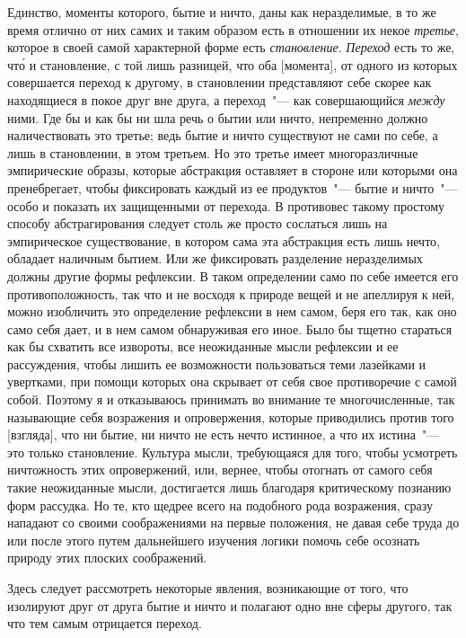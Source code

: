 Единство, моменты которого, бытие и ничто, даны как
неразделимые, в то же время отлично от них самих и таким
образом есть в отношении их некое \emph{третье}, которое
в своей самой характерной форме есть \emph{становление}. \emph{Переход}
есть то же, чт\'о и становление, с той лишь разницей,
что оба [момента], от одного из которых совершается переход
к другому, в становлении представляют себе скорее
как находящиеся в покое друг вне друга, а переход~"--- как
совершающийся \emph{между} ними. Где бы и как бы ни шла
речь о бытии или ничто, непременно должно наличествовать
это третье; ведь бытие и ничто существуют не сами
по себе, а лишь в становлении, в этом третьем. Но это
третье имеет многоразличные эмпирические образы, которые
абстракция оставляет в стороне или которыми она
пренебрегает, чтобы фиксировать каждый из ее продуктов~"---
бытие и ничто~"--- особо и показать их защищенными
от перехода. В противовес такому простому способу
абстрагирования следует столь же просто сослаться лишь
на эмпирическое существование, в котором сама эта абстракция
есть лишь нечто, обладает наличным бытием.
Или же фиксировать разделение неразделимых должны
другие формы рефлексии. В таком определении само по
себе имеется его противоположность, так что и не восходя
к природе вещей и не апеллируя к ней, можно изобличить
это определение рефлексии в нем самом, беря его
так, как оно само себя дает, и в нем самом обнаруживая
его иное. Было бы тщетно стараться как бы схватить все
извороты, все неожиданные мысли рефлексии и ее рассуждения,
чтобы лишить ее возможности пользоваться теми
лазейками и увертками, при помощи которых она
скрывает от себя свое противоречие с самой собой. Поэтому
я и отказываюсь принимать во внимание те многочисленные,
так называющие себя возражения и опровержения,
которые приводились против того [взгляда], что
ни бытие, ни ничто не есть нечто истинное, а что их истина~"---
это только становление. Культура мысли, требующаяся
для того, чтобы усмотреть ничтожность этих опровержений,
или, вернее, чтобы отогнать от самого себя такие
неожиданные мысли, достигается лишь благодаря критическому
познанию форм рассудка. Но те, кто щедрее всего
на подобного рода возражения, сразу нападают со своими
соображениями на первые положения, не давая себе
труда до или после этого путем дальнейшего изучения
логики помочь себе осознать природу этих плоских соображений.

Здесь следует рассмотреть некоторые явления, возникающие
от того, что изолируют друг от друга бытие и ничто
и полагают одно вне сферы другого, так что тем самым
отрицается переход.

